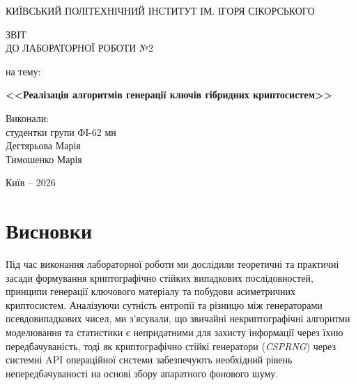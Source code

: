\documentclass[12pt,a4paper]{article}
\begin{document}
\begin{titlepage}

\begin{center}

КИЇВСЬКИЙ ПОЛІТЕХНІЧНИЙ ІНСТИТУТ
ІМ. ІГОРЯ СІКОРСЬКОГО

\vspace{2cm}

{\large ЗВІТ}\\
{\large ДО ЛАБОРАТОРНОЇ РОБОТИ №2}

\vspace{1cm}

{\large на тему:}

\vspace{0.5cm}

\textbf{<<Реалізація алгоритмів генерації ключів гібридних криптосистем>>}

\end{center}

\vfill

\begin{flushright}
\begin{minipage}{0.4\textwidth}

Виконали:\\
студентки групи ФІ-62 мн\\
Дегтярьова Марія\\
Тимошенко Марія

\end{minipage}
\end{flushright}

\vfill

\begin{center}
Київ -- 2026
\end{center}

\end{titlepage}

\tableofcontents
\newpage









\section*{Висновки}

Під час виконання лабораторної роботи ми дослідили теоретичні та практичні засади формування
криптографічно стійких випадкових послідовностей, принципи генерації ключового матеріалу та побудови
асиметричних криптосистем. Аналізуючи сутність ентропії та різницю між генераторами псевдовипадкових
чисел, ми з'ясували, що звичайні некриптографічні алгоритми моделювання та статистики є непридатними
для захисту інформації через їхню передбачуваність, тоді як криптографічно стійкі генератори
(\textit{CSPRNG}) через системні API операційної системи забезпечують необхідний рівень
непередбачуваності на основі збору апаратного фонового шуму. 
\end{document}
